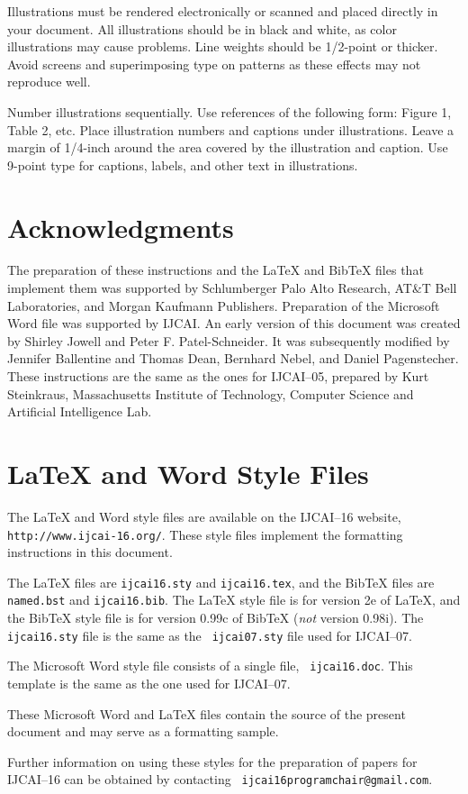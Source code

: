 \documentclass{article}
\begin{document}
Illustrations must be rendered electronically or scanned and placed
directly in your document. All illustrations should be in black and
white, as color illustrations may cause problems. Line weights should
be 1/2-point or thicker. Avoid screens and superimposing type on
patterns as these effects may not reproduce well.

Number illustrations sequentially. Use references of the following
form: Figure 1, Table 2, etc. Place illustration numbers and captions
under illustrations. Leave a margin of 1/4-inch around the area
covered by the illustration and caption.  Use 9-point type for
captions, labels, and other text in illustrations.

\section*{Acknowledgments}

The preparation of these instructions and the \LaTeX{} and Bib\TeX{}
files that implement them was supported by Schlumberger Palo Alto
Research, AT\&T Bell Laboratories, and Morgan Kaufmann Publishers.
Preparation of the Microsoft Word file was supported by IJCAI.  An
early version of this document was created by Shirley Jowell and Peter
F. Patel-Schneider.  It was subsequently modified by Jennifer
Ballentine and Thomas Dean, Bernhard Nebel, and Daniel Pagenstecher.
These instructions are the same as the ones for IJCAI--05, prepared by
Kurt Steinkraus, Massachusetts Institute of Technology, Computer
Science and Artificial Intelligence Lab.

\appendix

\section{\LaTeX{} and Word Style Files}\label{stylefiles}

The \LaTeX{} and Word style files are available on the IJCAI--16
website, {\tt http://www.ijcai-16.org/}.
These style files implement the formatting instructions in this
document.

The \LaTeX{} files are {\tt ijcai16.sty} and {\tt ijcai16.tex}, and
the Bib\TeX{} files are {\tt named.bst} and {\tt ijcai16.bib}. The
\LaTeX{} style file is for version 2e of \LaTeX{}, and the Bib\TeX{}
style file is for version 0.99c of Bib\TeX{} ({\em not} version
0.98i). The {\tt ijcai16.sty} file is the same as the {\tt
ijcai07.sty} file used for IJCAI--07.

The Microsoft Word style file consists of a single file, {\tt
ijcai16.doc}. This template is the same as the one used for
IJCAI--07.

These Microsoft Word and \LaTeX{} files contain the source of the
present document and may serve as a formatting sample.  

Further information on using these styles for the preparation of
papers for IJCAI--16 can be obtained by contacting {\tt
ijcai16programchair@gmail.com}.



\end{document}
